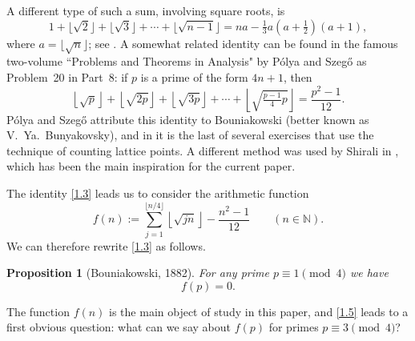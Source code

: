 \documentclass{amsart}
\theoremstyle{plain}
\newtheorem{proposition}[theorem]{Proposition}
\numberwithin{equation}{section}
\begin{document}
A different type of such a sum, involving square roots, is
\begin{equation}\label{1.2}
1+\lfloor{\sqrt{2}}\rfloor+\lfloor{\sqrt{3}}\rfloor
+\cdots+\lfloor{\sqrt{n-1}}\rfloor = na-\tfrac{1}{3}a(a+\tfrac{1}{2})(a+1),
\end{equation}
where $a=\lfloor{\sqrt{n}}\rfloor$; see \cite[p.~87]{GKP}. A somewhat related
identity can be found in the famous two-volume ``Problems and Theorems in
Analysis" by P\'olya and Szeg{\H o} \cite{PS2} as Problem~20 in Part~8: if 
$p$ is a prime of the form $4n+1$, then
\begin{equation}\label{1.3}
\left\lfloor{\sqrt{p}}\right\rfloor+\left\lfloor{\sqrt{2p}}\right\rfloor+
\left\lfloor{\sqrt{3p}}\right\rfloor
+\cdots+\left\lfloor{\sqrt{\tfrac{p-1}{4}p}}\right\rfloor = \frac{p^2-1}{12}.
\end{equation}
P\'olya and Szeg{\H o} attribute this identity to Bouniakowski \cite{Bou} 
(better known as V.~Ya.~Bunyakovsky), and
in \cite{PS2} it is the last of several exercises that use the technique of
counting lattice points. A different method was used by Shirali in \cite{Sh}, 
which has been the main inspiration for the current paper. 

The identity \eqref{1.3} leads us to consider the arithmetic function
\begin{equation}\label{1.4}
f(n):=\sum_{j=1}^{\lfloor{n/4}\rfloor}\left\lfloor{\sqrt{jn}}\right\rfloor
-\frac{n^2-1}{12}\qquad(n\in{\mathbb N}).
\end{equation}
We can therefore rewrite \eqref{1.3} as follows.

\begin{proposition}[Bouniakowski, 1882]\label{prop:1.1}
For any  prime $p\equiv1\pmod{4}$ we have
\begin{equation}\label{1.5}
f(p)=0.
\end{equation}
\end{proposition}

The function $f(n)$ is the main object of study in this paper, and \eqref{1.5}
leads to a first obvious question: what can we say about $f(p)$ for primes
$p\equiv 3\pmod{4}$?
\end{document}
